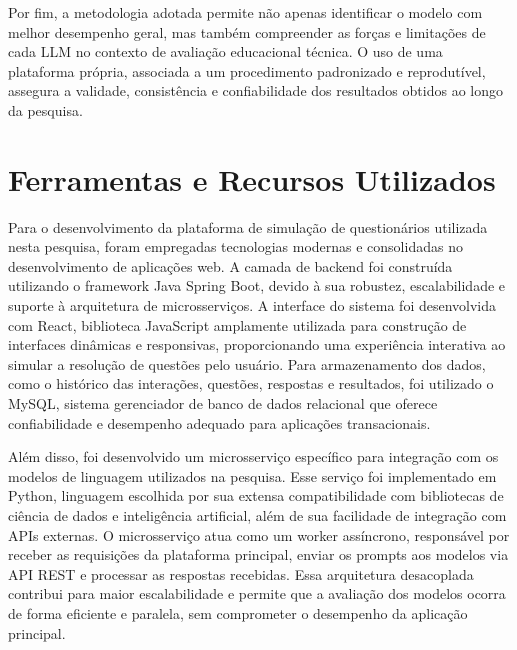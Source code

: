 Por fim, a metodologia adotada permite não apenas identificar o modelo com melhor desempenho geral, mas também compreender as forças e limitações de cada LLM no contexto de avaliação educacional técnica. O uso de uma plataforma própria, associada a um procedimento padronizado e reprodutível, assegura a validade, consistência e confiabilidade dos resultados obtidos ao longo da pesquisa.

\section{Ferramentas e Recursos Utilizados}
Para o desenvolvimento da plataforma de simulação de questionários utilizada nesta pesquisa, foram empregadas tecnologias modernas e consolidadas no desenvolvimento de aplicações web. A camada de backend foi construída utilizando o framework Java Spring Boot, devido à sua robustez, escalabilidade e suporte à arquitetura de microsserviços. A interface do sistema foi desenvolvida com React, biblioteca JavaScript amplamente utilizada para construção de interfaces dinâmicas e responsivas, proporcionando uma experiência interativa ao simular a resolução de questões pelo usuário. Para armazenamento dos dados, como o histórico das interações, questões, respostas e resultados, foi utilizado o MySQL, sistema gerenciador de banco de dados relacional que oferece confiabilidade e desempenho adequado para aplicações transacionais.

Além disso, foi desenvolvido um microsserviço específico para integração com os modelos de linguagem utilizados na pesquisa. Esse serviço foi implementado em Python, linguagem escolhida por sua extensa compatibilidade com bibliotecas de ciência de dados e inteligência artificial, além de sua facilidade de integração com APIs externas. O microsserviço atua como um worker assíncrono, responsável por receber as requisições da plataforma principal, enviar os prompts aos modelos via API REST e processar as respostas recebidas. Essa arquitetura desacoplada contribui para maior escalabilidade e permite que a avaliação dos modelos ocorra de forma eficiente e paralela, sem comprometer o desempenho da aplicação principal.

